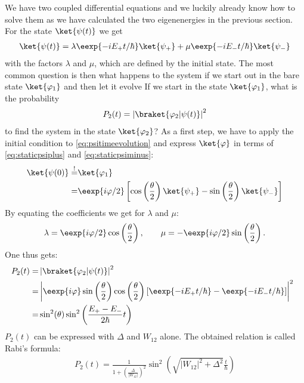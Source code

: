 We have two coupled differential equations and we luckily already know how to solve them as we have calculated the two eigenenergies in the previous section. For the state $\ket{\psi(t)}$ we get
\begin{align}
 \ket{\psi(t)}=\lambda \eexp{-i{E_+}t/{\hbar}} \ket{\psi_+} + \mu \eexp{-i{E_-}t/{\hbar}} \ket{\psi_-} \label{eq:psitimeevolution}
\end{align}
with the factors $\lambda$ and $\mu$, which are defined by the initial state. The most common question is then what happens to the system if we start out in the bare state $\ket{\varphi_1}$ and then let it evolve 
If we start in the state $\ket{\varphi_1}$, what is the probability
				\begin{align}
					P_2(t)=\left|\braket{\varphi_2|\psi(t)}\right|^2
				\end{align}
				to find the system in the state $\ket{\varphi_2}$? As a first step, we have to apply the initial condition to \eqref{eq:psitimeevolution} and express $\ket{\varphi}$ in terms of \eqref{eq:staticpsiplus} and \eqref{eq:staticpsiminus}:
				\begin{align}
					\ket{\psi(0)} \overset{!}{=}& \ket{\varphi_1}\\
											  = & \eexp{i{\varphi}/{2}} \left[ \cos\left( \frac{\theta}{2}\right) \ket{\psi_+}-\sin\left(\frac{\theta}{2}\right)\ket{\psi_-}\right]
				\end{align}
				By equating the coefficients we get for $\lambda$ and $\mu$:
				\begin{align}
					\lambda = \eexp{i{\varphi}/{2}}\cos\left(\frac{\theta}{2}\right), \qquad  \mu = -\eexp{i{\varphi}/{2}}\sin\left(\frac{\theta}{2}\right).
				\end{align}
				One thus gets:
				\begin{align}
					\hspace{-2mm} P_2(t)	=&\left|\braket{\varphi_2|\psi(t)}\right|^2 \\
											=& \left|\eexp{i\varphi} \sin\left(\frac{\theta}{2}\right)\cos\left(\frac{\theta}{2}\right)\left[\eexp{-i{E_+}t/{\hbar}} - \eexp{-i{E_-}t/{\hbar}}\right]\right|^2\\
											=& \sin^2(\theta)\sin^2\left(\frac{E_+-E_-}{2\hbar}t\right)
				\end{align}
$P_2(t)$ can be expressed with $\Delta$ and $W_{12}$ alone. The obtained relation is called Rabi's formula:
\begin{align}
 P_2(t)=\frac{1}{1+\left(\frac{\Delta}{|W_{12}|}\right)^2}\sin^2\left(\sqrt{|W_{12}|^2+\Delta^2}\frac{t}{\hbar}\right)
\end{align}